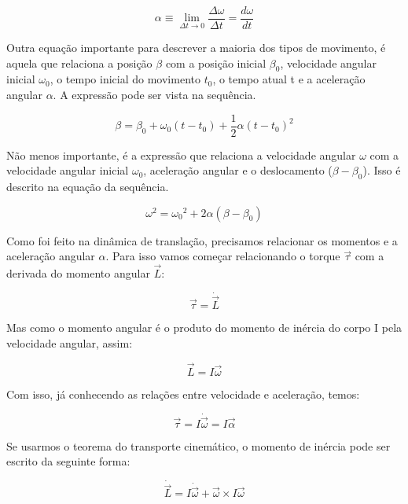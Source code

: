 \begin{equation}
\alpha\equiv\lim_{\Delta t\rightarrow 0}\frac{\Delta\omega}{\Delta t}=\frac{d\omega}{dt}
\end{equation}

Outra equação importante para descrever a maioria dos tipos de movimento, é aquela que relaciona a posição $\beta$ com a posição inicial $\beta_0$, velocidade angular inicial $\omega_0$, o tempo inicial do movimento $t_0$, o tempo atual t e a aceleração angular $\alpha$. A expressão pode ser vista na sequência.

\begin{equation}
\beta=\beta_{0}+\omega_{0}(t-t_{0})+\frac{1}{2}\alpha{(t-t_{0})}^{2}
\end{equation}

Não menos importante, é a expressão que relaciona a velocidade angular $\omega$ com a velocidade angular inicial $\omega_0$, aceleração angular e o deslocamento ($\beta-\beta_0$). Isso é descrito na equação da sequência.

\begin{equation}
{\omega}^{2}={\omega_0}^{2}+2\alpha(\beta-\beta_0) 
\end{equation}

Como foi feito na dinâmica de translação, precisamos relacionar os momentos e a aceleração angular $\alpha$. Para isso vamos começar relacionando o torque $\vec{\tau}$ com a derivada do momento angular $\vec{L}$:

\begin{equation}
\vec{\tau}=\dot{\vec{L}}
\end{equation}

Mas como o momento angular é o produto do momento de inércia do corpo I pela velocidade angular, assim: 

\begin{equation}\label{eq:iomega}
\vec{L}=I\vec{\omega}
\end{equation}

Com isso, já conhecendo as relações entre velocidade e aceleração, temos:  

\begin{equation}\label{iomega}
\vec{\tau}=I\dot{\vec{\omega}}=I\vec{\alpha}
\end{equation}

Se usarmos o teorema do transporte cinemático, o momento de inércia pode ser escrito da seguinte forma:

\begin{equation}
\dot{\vec{L}}=I\dot{\vec{\omega}}+\vec{\omega}\times I \vec{\omega}
\end{equation}

